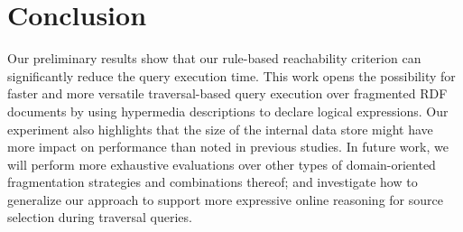 \section{Conclusion}

Our preliminary results show that our rule-based reachability criterion can significantly reduce the query execution time.
This work opens the possibility for faster and more versatile traversal-based query execution over fragmented RDF documents by using hypermedia descriptions to declare logical expressions.
Our experiment also highlights that the size of the internal data store might have more impact on performance than noted in previous studies.
In future work, we will perform more exhaustive evaluations over other types of domain-oriented fragmentation strategies and combinations thereof;
and investigate how to generalize our approach to support more expressive online reasoning for source selection during traversal queries.
